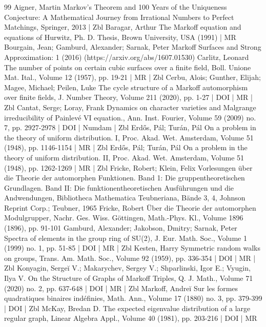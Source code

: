 \begin{thebibliography}{99}
Aigner, Martin Markov’s Theorem and 100 Years of the Uniqueness Conjecture: A Mathematical Journey from Irrational Numbers to Perfect Matchings, Springer, 2013 | Zbl
Baragar, Arthur The Markoff equation and equations of Hurwitz, Ph. D. Thesis, Brown University, USA (1991) | MR
Bourgain, Jean; Gamburd, Alexander; Sarnak, Peter Markoff Surfaces and Strong Approximation: 1 (2016) (https://arxiv.org/abs/1607.01530)
Carlitz, Leonard The number of points on certain cubic surfaces over a finite field, Boll. Unione Mat. Ital., Volume 12 (1957), pp. 19-21 | MR | Zbl
Cerbu, Alois; Gunther, Elijah; Magee, Michael; Peilen, Luke The cycle structure of a Markoff automorphism over finite fields, J. Number Theory, Volume 211 (2020), pp. 1-27 | DOI | MR | Zbl
Cantat, Serge; Loray, Frank Dynamics on character varieties and Malgrange irreducibility of Painlevé VI equation., Ann. Inst. Fourier, Volume 59 (2009) no. 7, pp. 2927-2978 | DOI | Numdam | Zbl
Erdős, Pál; Turán, Pál On a problem in the theory of uniform distribution. I, Proc. Akad. Wet. Amsterdam, Volume 51 (1948), pp. 1146-1154 | MR | Zbl
Erdős, Pál; Turán, Pál On a problem in the theory of uniform distribution. II, Proc. Akad. Wet. Amsterdam, Volume 51 (1948), pp. 1262-1269 | MR | Zbl
Fricke, Robert; Klein, Felix Vorlesungen über die Theorie der automorphen Funktionen. Band 1: Die gruppentheoretischen Grundlagen. Band II: Die funktionentheoretischen Ausführungen und die Andwendungen, Bibliotheca Mathematica Teubneriana, Bände 3, 4, Johnson Reprint Corp.; Teubner, 1965
Fricke, Robert Über die Theorie der automorphen Modulgrupper, Nachr. Ges. Wiss. Göttingen, Math.-Phys. Kl., Volume 1896 (1896), pp. 91-101
Gamburd, Alexander; Jakobson, Dmitry; Sarnak, Peter Spectra of elements in the group ring of SU(2), J. Eur. Math. Soc., Volume 1 (1999) no. 1, pp. 51-85 | DOI | MR | Zbl
Kesten, Harry Symmetric random walks on groups, Trans. Am. Math. Soc., Volume 92 (1959), pp. 336-354 | DOI | MR | Zbl
Konyagin, Sergeĭ V.; Makarychev, Sergey V.; Shparlinski, Igor E.; Vyugin, Ilya V. On the Structure of Graphs of Markoff Triples, Q. J. Math., Volume 71 (2020) no. 2, pp. 637-648 | DOI | MR | Zbl
Markoff, Andreĭ Sur les formes quadratiques binaires indéfinies, Math. Ann., Volume 17 (1880) no. 3, pp. 379-399 | DOI | Zbl
McKay, Bredan D. The expected eigenvalue distribution of a large regular graph, Linear Algebra Appl., Volume 40 (1981), pp. 203-216 | DOI | MR

\end{thebibliography}
